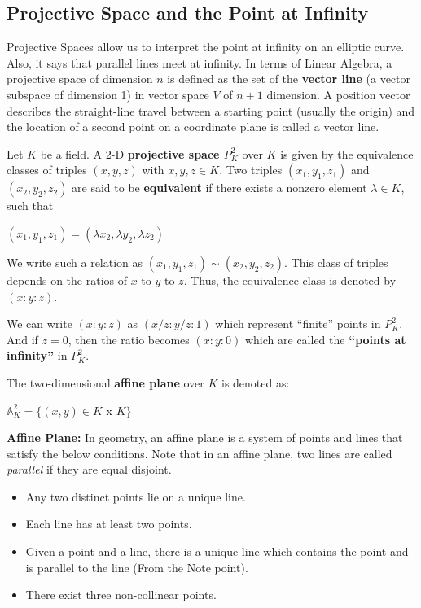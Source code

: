 \documentclass[a4paper, 12pt]{article}
\begin{document}
\subsection{Projective Space and the Point at Infinity}
Projective Spaces allow us to interpret the point at infinity on an elliptic curve. Also, it says that parallel lines meet at infinity. In terms of Linear Algebra, a projective space of dimension $n$ is defined as the set of the \textbf{vector line} (a vector subspace of dimension 1) in vector space $V$ of $n+1$ dimension.
A position vector describes the straight-line travel between a starting point (usually the origin) and the location of a second point on a coordinate plane is called a vector line.\par
Let $K$ be a field. A 2-D \textbf{projective space $P_K^2$} over $K$ is given by the equivalence classes of triples $(x,y,z)$ with $x,y,z \in K$. Two triples $(x_1,y_1,z_1)$ and $(x_2,y_2,z_2)$ are said to be \textbf{equivalent} if there exists a nonzero element $\lambda \in K$, such that
\begin{center}
$(x_1,y_1,z_1) = (\lambda x_2,\lambda y_2, \lambda z_2)$
\end{center}
We write such a relation as $(x_1,y_1,z_1) \sim (x_2,y_2,z_2)$. This class of triples depends on the ratios of $x$ to $y$ to $z$. Thus, the equivalence class is denoted by $(x:y:z)$.\par
We can write $(x:y:z)$ as $(x/z:y/z:1)$ which represent ``finite'' points in \textbf{$P_K^2$}. And if $z=0$, then the ratio becomes $(x:y:0)$ which are called the \textbf{``points at infinity''} in \textbf{$P_K^2$}. \par
The two-dimensional \textbf{affine plane} over $K$ is denoted as:
\begin{center} $\mathbb{A}_K^2 = \{(x,y)\in K$ x $K\}$\end{center}
\textbf{Affine Plane:} In geometry, an affine plane is a system of points and lines that satisfy the below conditions. Note that in an affine plane, two lines are called \textit{parallel} if they are equal disjoint. 
\begin{itemize}
	\item Any two distinct points lie on a unique line.
	\item Each line has at least two points.
	\item Given a point and a line, there is a unique line which contains the point and is parallel to the line (From the Note point).
	\item There exist three non-collinear points.
\end{itemize}
\end{document}
